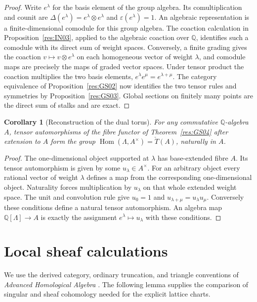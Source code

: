 \documentclass[11pt,oneside,openany]{book}
\newtheorem{corollary}[theorem]{Corollary}
\theoremstyle{definition}
\theoremstyle{remark}
\begin{document}
\begin{proof}
Write \(e^\lambda\) for the basis element of the group algebra.
Its comultiplication and counit are
\(\Delta(e^\lambda)=e^\lambda\otimes e^\lambda\) and
\(\varepsilon(e^\lambda)=1\). An algebraic representation is a
finite-dimensional comodule for this group algebra. The coaction
calculation in Proposition~\ref{res:IN03}, applied to the algebraic
coaction over \(\mathbb Q\), identifies such a comodule with its
direct sum of weight spaces.
Conversely, a finite grading gives the coaction
\(v\mapsto v\otimes e^\lambda\) on each homogeneous vector of
weight \(\lambda\), and comodule maps are precisely the maps of
graded vector spaces.
Under tensor product the coaction multiplies the two basis
elements, \(e^\lambda e^\mu=e^{\lambda+\mu}\).
The category equivalence of Proposition~\ref{res:GS02} now
identifies the two tensor rules and symmetries by
Proposition~\ref{res:GS03}. Global sections on finitely many
points are the direct sum of stalks and are exact.
\end{proof}

\begin{corollary}[Reconstruction of the dual torus]
\label{res:GS05}
For any commutative \(\mathbb Q\)-algebra \(A\), tensor
automorphisms of the fibre functor of Theorem~\ref{res:GS04}
after extension to \(A\) form the group
\(\operatorname{Hom}(\Lambda,A^\times)=\check T(A)\),
naturally in \(A\).
\end{corollary}

\begin{proof}
The one-dimensional object supported at \(\lambda\) has
base-extended fibre \(A\). Its tensor automorphism is given
by some \(u_\lambda\in A^\times\). For an arbitrary object
every rational vector of weight \(\lambda\) defines a map from
the corresponding one-dimensional object. Naturality forces
multiplication by \(u_\lambda\) on that whole extended weight
space. The unit and convolution rule give
\(u_0=1\) and \(u_{\lambda+\mu}=u_\lambda u_\mu\).
Conversely these conditions define a natural tensor automorphism.
An algebra map \(\mathbb Q[\Lambda]\to A\) is exactly the
assignment \(e^\lambda\mapsto u_\lambda\) with these conditions.
\end{proof}

\section{Local sheaf calculations}

We use the derived category, ordinary truncation, and triangle
conventions of \emph{Advanced Homological Algebra}
\cite[Results D03, D05 and D08, PDF pp.~24--27]{mg-ha}.
The following lemma supplies the comparison of singular and sheaf
cohomology needed for the explicit lattice charts.
\end{document}
